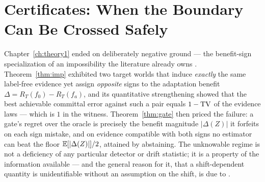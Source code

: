 
\chapter{Certificates: When the Boundary Can Be Crossed Safely}
\label{ch:theory2}

Chapter~\ref{ch:theory1} ended on deliberately negative ground --- the benefit-sign
specialization of an impossibility the literature already owns \cite{garg2022atc,
kalai2021abstain}. Theorem~\ref{thm:imp} exhibited two target worlds that induce
\emph{exactly} the same label-free evidence yet assign \emph{opposite} signs to the
adaptation benefit $\Delta = R_T(f_0) - R_T(f_a)$, and its quantitative strengthening
showed that the best achievable committal error against such a pair equals $1-\mathrm{TV}$ of
the evidence laws --- which is $1$ in the witness. Theorem~\ref{thm:gate} then priced
the failure: a gate's regret over the oracle is precisely the benefit magnitude
$|\Delta(Z)|$ it forfeits on each sign mistake, and on evidence compatible with both
signs no estimator can beat the floor $\mathbb{E}[|\Delta(Z)|]/2$, attained by abstaining. The
unknowable regime is not a deficiency of any particular detector or drift statistic; it
is a property of the information available --- and the general reason for it, that a
shift-dependent quantity is unidentifiable without an assumption on the shift, is due to
\cite{garg2022atc}.

